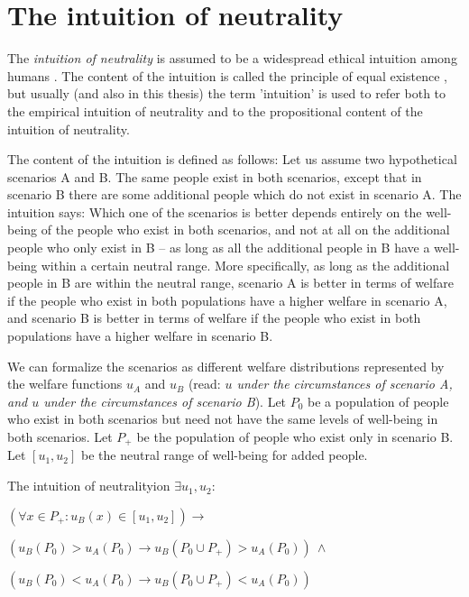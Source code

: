 \section{The intuition of neutrality}

The \emph{intuition of neutrality} is assumed to be a widespread ethical intuition among humans \cite[p.~176f]{broome_2012}. The content of the intuition is called the principle of equal existence \cite[p.~146]{broome_2004}, but usually (and also in this thesis) the term 'intuition' is used to refer both to the empirical intuition of neutrality and to the propositional content of the intuition of neutrality. 

The content of the intuition is defined as follows: Let us assume two hypothetical scenarios A and B. The same people exist in both scenarios, except that in scenario B there are some additional people which do not exist in scenario A. The intuition says: Which one of the scenarios is better depends entirely on the well-being of the people who exist in both scenarios, and not at all on the additional people who only exist in B – as long as all the additional people in B have a well-being within a certain neutral range. More specifically, as long as the additional people in B are within the neutral range, scenario A is better in terms of welfare if the people who exist in both populations have a higher welfare in scenario A, and scenario B is better in terms of welfare if the people who exist in both populations have a higher welfare in scenario B.  

We can formalize the scenarios as different welfare distributions represented by the welfare functions $u_A$ and $u_B$ (read: \emph{$u$ under the circumstances of scenario A, and $u$ under the circumstances of scenario B}). Let $P_0$ be a population of people who exist in both scenarios but need not have the same levels of well-being in both scenarios. Let $P_+$ be the population of people who exist only in scenario B. Let $[u_1, u_2]$ be the neutral range of well-being for added people. 

\begin{Definition}{The intuition of neutrality}{ion} 
$
  \exists u_1, u_2: 
$

\hspace{.5cm} $
  (\forall x \in P_+ : u_B(x) \in [u_1, u_2] )
  \rightarrow 
$

\hspace{1cm} $
  ( u_B(P_0) > u_A(P_0) 
  \rightarrow 
  u_B(P_0 \cup P_+) > u_A(P_0) ) 
  \ \wedge
$  

\hspace{1cm} $
  ( u_B(P_0) < u_A(P_0) 
  \rightarrow 
  u_B(P_0 \cup P_+) < u_A(P_0) ) 
$
\end{Definition}

